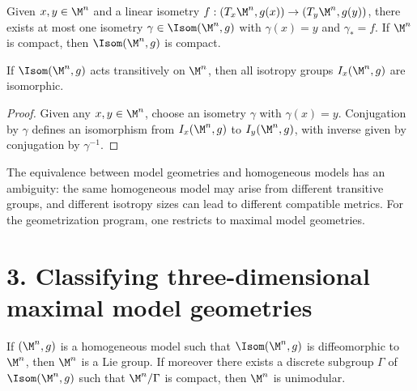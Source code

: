 \begin{corollary}
\label{ch01-cor-unique-isometry}
Given $x,y \in \M^n$ and a linear isometry $f : (T_x \M^n,g(x)) \to (T_y \M^n,g(y))$, there exists at most one isometry $\gamma \in \Isom(\M^n,g)$ with $\gamma(x)=y$ and $\gamma_* = f$. If $\M^n$ is compact, then $\Isom(\M^n,g)$ is compact.
\end{corollary}

\begin{lemma}
\label{ch01-lem-isotropy-isomorphic}
If $\Isom(\M^n,g)$ acts transitively on $\M^n$, then all isotropy groups $I_x(\M^n,g)$ are isomorphic.
\end{lemma}

\begin{proof}
\sketch Given any $x,y \in \M^n$, choose an isometry $\gamma$ with $\gamma(x)=y$. Conjugation by $\gamma$ defines an isomorphism from $I_x(\M^n,g)$ to $I_y(\M^n,g)$, with inverse given by conjugation by $\gamma^{-1}$.
\end{proof}

\begin{remark}
\label{ch01-rem-model-geometry-ambiguity}
The equivalence between model geometries and homogeneous models has an ambiguity: the same homogeneous model may arise from different transitive groups, and different isotropy sizes can lead to different compatible metrics. For the geometrization program, one restricts to maximal model geometries.
\end{remark}

\section*{3. Classifying three-dimensional maximal model geometries}

\begin{lemma}
\label{ch01-lem-unimodular-lie-group}
If $(\M^n,g)$ is a homogeneous model such that $\Isom(\M^n,g)$ is diffeomorphic to $\M^n$, then $\M^n$ is a Lie group. If moreover there exists a discrete subgroup $\Gamma$ of $\Isom(\M^n,g)$ such that $\M^n/\Gamma$ is compact, then $\M^n$ is unimodular.
\end{lemma}

